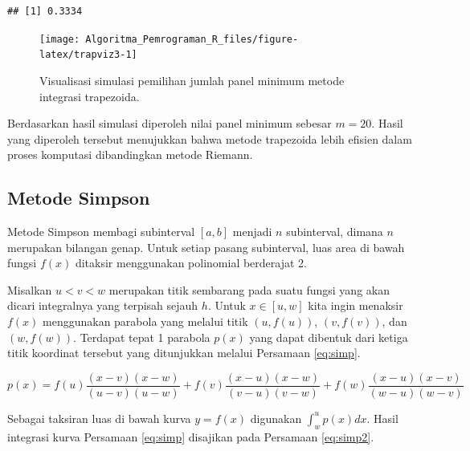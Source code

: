 \documentclass[
]{book}
\theoremstyle{definition}
\theoremstyle{definition}
\theoremstyle{definition}
\theoremstyle{definition}
\theoremstyle{remark}
\begin{document}
\begin{verbatim}
## [1] 0.3334
\end{verbatim}

\begin{figure}

{\centering \texttt{[image: Algoritma\_Pemrograman\_R\_files/figure-latex/trapviz3-1]} 

}

\caption{Visualisasi simulasi pemilihan jumlah panel minimum metode integrasi trapezoida.}\label{fig:trapviz3}
\end{figure}

Berdasarkan hasil simulasi diperoleh nilai panel minimum sebesar \(m=20\). Hasil yang diperoleh tersebut menujukkan bahwa metode trapezoida lebih efisien dalam proses komputasi dibandingkan metode Riemann.

\hypertarget{simpson}{%
\subsection{Metode Simpson}\label{simpson}}

Metode Simpson membagi subinterval \(\left[a,b\right]\) menjadi
\(n\) subinterval, dimana \(n\) merupakan bilangan genap. Untuk setiap pasang subinterval, luas area di bawah fungsi \(f\left(x\right)\) ditaksir menggunakan polinomial berderajat 2.

Misalkan \(u<v<w\) merupakan titik sembarang pada suatu fungsi yang akan dicari integralnya yang terpisah sejauh \(h\). Untuk \(x\in\left[u,w\right]\) kita ingin menaksir \(f\left(x\right)\) menggunakan parabola yang melalui titik \(\left(u, f\left(u\right)\right)\), \(\left(v, f\left(v\right)\right)\), dan \(\left(w, f\left(w\right)\right)\). Terdapat tepat 1 parabola \(p\left(x\right)\) yang dapat dibentuk dari ketiga titik koordinat tersebut yang ditunjukkan melalui Persamaan \eqref{eq:simp}.

\begin{equation}
p\left(x\right)=f\left(u\right)\frac{\left(x-v\right)\left(x-w\right)}{\left(u-v\right)\left(u-w\right)}+f\left(v\right)\frac{\left(x-u\right)\left(x-w\right)}{\left(v-u\right)\left(v-w\right)}+f\left(w\right)\frac{\left(x-u\right)\left(x-v\right)}{\left(w-u\right)\left(w-v\right)}
  \label{eq:simp}
\end{equation}

Sebagai taksiran luas di bawah kurva \(y=f\left(x\right)\) digunakan \(\int_{w}^u p\left(x\right)dx\). Hasil integrasi kurva Persamaan \eqref{eq:simp} disajikan pada Persamaan \eqref{eq:simp2}.
\end{document}
